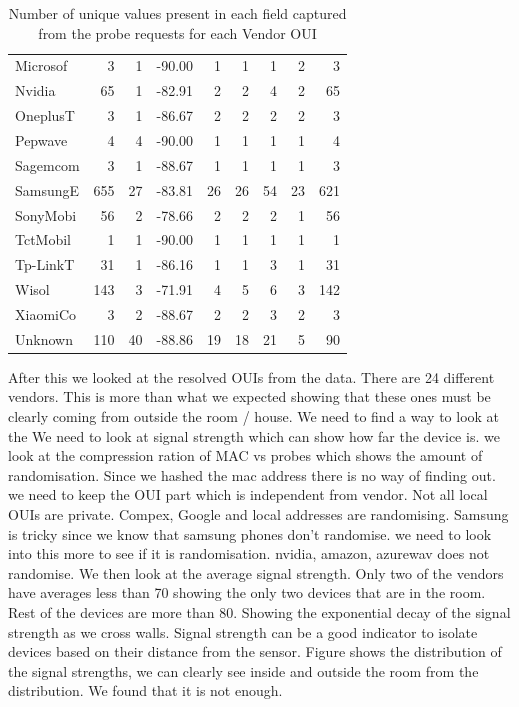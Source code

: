 \begin{table}
\begin{center}
\begin{tabular}{lrrrrrrrr}
  Microsof &    3 &   1 & -90.00 &   1 &   1 &   1 &   2 &   3 \\ 
  Nvidia   &   65 &   1 & -82.91 &   2 &   2 &   4 &   2 &  65 \\ 
  OneplusT &    3 &   1 & -86.67 &   2 &   2 &   2 &   2 &   3 \\ 
  Pepwave  &    4 &   4 & -90.00 &   1 &   1 &   1 &   1 &   4 \\ 
  Sagemcom &    3 &   1 & -88.67 &   1 &   1 &   1 &   1 &   3 \\ 
  SamsungE &  655 &  27 & -83.81 &  26 &  26 &  54 &  23 & 621 \\ 
  SonyMobi &   56 &   2 & -78.66 &   2 &   2 &   2 &   1 &  56 \\ 
  TctMobil &    1 &   1 & -90.00 &   1 &   1 &   1 &   1 &   1 \\ 
  Tp-LinkT &   31 &   1 & -86.16 &   1 &   1 &   3 &   1 &  31 \\ 
  Wisol    &  143 &   3 & -71.91 &   4 &   5 &   6 &   3 & 142 \\ 
  XiaomiCo &    3 &   2 & -88.67 &   2 &   2 &   3 &   2 &   3 \\ 
  Unknown  &  110 &  40 & -88.86 &  19 &  18 &  21 &   5 &  90 \\ 
  \bottomrule
  \end{tabular}
\end{center}
\caption{Number of unique values present in each field captured from the probe requests for each Vendor OUI}
\label{table:collection:proberequest}
\end{table}


After this we looked at the resolved OUIs from the data.
There are 24 different vendors.
This is more than what we expected showing that these ones must be clearly coming from outside the room / house.
We need to find a way to look at the
We need to look at signal strength which can show how far the device is.
we look at the compression ration of MAC vs probes which shows the amount of randomisation.
Since we hashed the mac address there is no way of finding out. we need to keep the OUI part which is independent from vendor. Not all local OUIs are private.
Compex, Google and local addresses are randomising.
Samsung is tricky since we know that samsung phones don't randomise. we need to look into this more to see if it is randomisation.
nvidia, amazon, azurewav does not randomise.
We then look at the average signal strength.
Only two of the vendors have averages less than 70 showing the only two devices that are in the room.
Rest of the devices are more than 80. Showing the exponential decay of the signal strength as we cross walls.
Signal strength can be a good indicator to isolate devices based on their distance from the sensor.
Figure shows the distribution of the signal strengths, we can clearly see inside and outside the room from the distribution.
We found that it is not enough.

